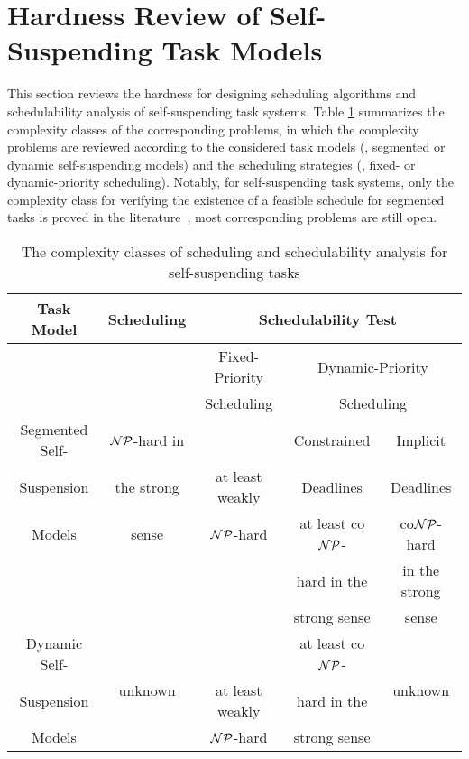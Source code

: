 \section{Hardness Review of Self-Suspending Task Models}
This section reviews the hardness for designing scheduling algorithms and schedulability analysis of self-suspending task systems. Table \ref{table:complexity} summarizes the complexity classes of the corresponding problems, in which the complexity problems are reviewed according to the considered task models (\ie, segmented or dynamic self-suspending models) and the scheduling strategies (\ie, fixed- or dynamic-priority scheduling). Notably, for self-suspending task systems, only the complexity class for verifying the existence of a feasible schedule for segmented tasks is proved in the literature~\cite{Ric03,Ridouard_2004}, most corresponding problems are still open.

\begin{table}
\centering
    \begin{tabular}{|c|c|c|c|c|}
 \hline
        Task Model & Scheduling & \multicolumn{3}{c|}{Schedulability Test} \\
        \hline
        &  & Fixed-Priority & \multicolumn{2}{c|}{Dynamic-Priority}\\
        &  & Scheduling     & \multicolumn{2}{c|}{Scheduling}\\
        \cline{3-5}    
        Segmented Self- & ${\cal NP}$-hard in &  & Constrained & Implicit\\
        Suspension  & the strong & at least weakly   & Deadlines   & Deadlines \\
        \cline{4-5}
        Models & sense \cite{Ridouard_2004} & ${\cal NP}$-hard & at least co${\cal NP}$- & co${\cal NP}$-hard \\
        &  & & hard in the & in the strong\\
        & & & strong sense & sense\\
        \hline
        Dynamic Self- & \multirow{3}{*}{unknown} & & at least co${\cal NP}$- & \multirow{3}{*}{unknown}\\
        Suspension & & at least weakly &hard in the & \\
        Models & & ${\cal NP}$-hard & strong sense & \\
        \hline
    \end{tabular}
    \caption{The complexity classes of scheduling and schedulability analysis for self-suspending tasks}
    \label{table:complexity}
\end{table}

